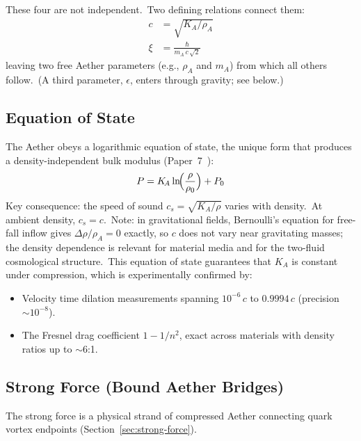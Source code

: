 ﻿\documentclass[12pt,letterpaper]{article}
\newcommand{\rhoa}{\rho_{\!A}}
\newcommand{\Ka}{K_{\!A}}
\begin{document}
These four are not independent.\ Two defining relations connect them:
%
\begin{align}
  c &= \sqrt{\Ka / \rhoa}
    \label{eq:sum-speed-of-light} \\
  \xi &= \frac{\hbar}{m_A\,c\,\sqrt{2}}
    \label{eq:sum-healing-length}
\end{align}
%
leaving two free Aether parameters (e.g., $\rhoa$ and $m_A$) from which all
others follow.\ (A third parameter, $\epsilon$, enters through gravity; see below.)


\subsection{Equation of State}

The Aether obeys a logarithmic equation of state, the unique form that produces
a density-independent bulk modulus (Paper~7~\cite{otto-quantum}):
%
\begin{equation}
  P = \Ka \ln\!\Bigl(\frac{\rho}{\rho_0}\Bigr) + P_0
  \label{eq:sum-eos}
\end{equation}
%
Key consequence: the speed of sound $c_s = \sqrt{\Ka/\rho}$ varies with
density.\ At ambient density, $c_s = c$.\ Note: in gravitational fields,
Bernoulli's equation for free-fall inflow gives $\Delta\rho/\rhoa = 0$
exactly, so $c$ does not vary near gravitating masses; the density
dependence is relevant for material media and for the two-fluid
cosmological structure.\ This equation of state guarantees that $\Ka$ is
constant under compression, which is experimentally confirmed by:
%
\begin{itemize}[leftmargin=2em]
  \item Velocity time dilation measurements spanning $10^{-6}\,c$ to $0.9994\,c$
    (precision $\sim 10^{-8}$).
  \item The Fresnel drag coefficient $1 - 1/n^2$, exact across materials with
    density ratios up to $\sim$6:1.
\end{itemize}


\subsection{Strong Force (Bound Aether Bridges)}

The strong force is a physical strand of compressed Aether connecting
quark vortex endpoints (Section~\ref{sec:strong-force}).
%
\end{document}
